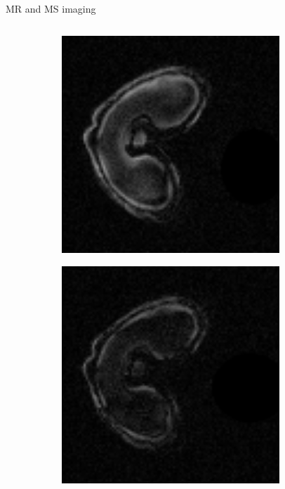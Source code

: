 \documentclass[10pt]{beamer}
\begin{document}
\begin{frame}{MR and MS imaging}
\begin{columns}
\begin{column}[t]{.5\textwidth}
\begin{figure}[ht]
\begin{subfigure}[t]{0.33\textwidth}
          \centering \includegraphics[width=0.9\textwidth]{fig/echo2_2}
        \end{subfigure}%
        \begin{subfigure}[t]{0.33\textwidth}
          \centering \includegraphics[width=0.9\textwidth]{fig/echo2_3}
        \end{subfigure}%
      \end{figure}

\end{column}
\end{columns}
\end{frame}
\end{document}
